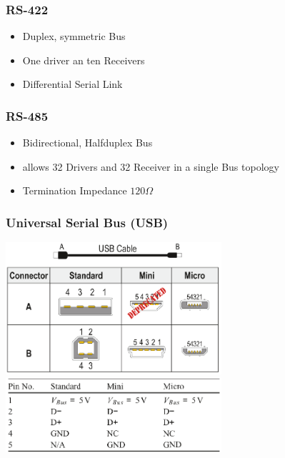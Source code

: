 \subsubsection{RS-422}
\begin{itemize}
	\item Duplex, symmetric Bus
	\item One driver an ten Receivers
	\item Differential Serial Link
\end{itemize}
\subsubsection{RS-485}
\begin{itemize}
	\item Bidirectional, Halfduplex Bus
	\item allows 32 Drivers and 32 Receiver in a single Bus topology
	\item Termination Impedance $120 \Omega$
\end{itemize}
\subsubsection{Universal Serial Bus (USB)}
\begin{multicols}{2}
	\includegraphics[width=8cm]{images/usb_jacks.png}\\
	\includegraphics[width=8cm]{images/usb_voltage.png}\\
\end{multicols}
